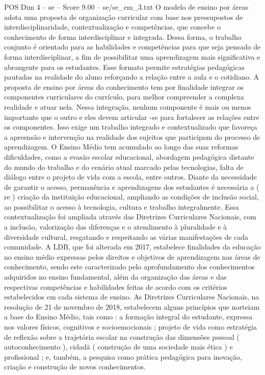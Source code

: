 \begin{textsample}{POS Dim 4 – se – Score 9.00 – se/se\_em\_3.txt}
O modelo de ensino por áreas adota uma proposta de organização curricular com base nos pressupostos de interdisciplinaridade, contextualização e competências, que concebe o conhecimento de forma interdisciplinar e integrada.
Dessa forma, o trabalho conjunto é orientado para as habilidades e competências para que seja pensado de forma interdisciplinar, a fim de possibilitar uma aprendizagem mais significativa e abrangente para os estudantes.
Esse formato permite estratégias pedagógicas pautadas na realidade do aluno reforçando a relação entre a aula e o cotidiano.
A proposta de ensino por áreas do conhecimento tem por finalidade integrar os componentes curriculares do currículo, para melhor compreender a complexa realidade e atuar nela.
Nessa integração, nenhum componente é mais ou menos importante que o outro e eles devem articular -se para fortalecer as relações entre os componentes.
Isso exige um trabalho integrado e contextualizado que favoreça a apreensão e intervenção na realidade dos sujeitos que participam do processo de aprendizagem.
O Ensino Médio tem acumulado ao longo das suas reformas dificuldades, como a evasão escolar educacional, abordagem pedagógica distante do mundo do trabalho e do cenário atual marcado pelas tecnologias, falta de diálogo entre o projeto de vida com a escola, entre outros.
Diante da necessidade de garantir o acesso, permanência e aprendizagens dos estudantes é necessária a ( re ) criação da instituição educacional, ampliando as condições de inclusão social, ao possibilitar o acesso à tecnologia, cultura e trabalho integralmente.
Essa contextualização foi ampliada através das Diretrizes Curriculares Nacionais, com a inclusão, valorização das diferenças e o atendimento à pluralidade e à diversidade cultural, resgatando e respeitando as várias manifestações de cada comunidade.
A LDB, que foi alterada em 2017, estabelece finalidades da educação no ensino médio expressas pelos direitos e objetivos de aprendizagem nas áreas de conhecimento, sendo este caracterizado pelo aprofundamento dos conhecimentos adquiridos no ensino fundamental, além da organização das áreas e das respectivas competências e habilidades feitas de acordo com os critérios estabelecidos em cada sistema de ensino.
As Diretrizes Curriculares Nacionais, na resolução de 21 de novembro de 2018, estabelecem alguns princípios que norteiam a base do Ensino Médio, tais como : a formação integral do estudante, expressa nos valores físicos, cognitivos e socioemocionais ; projeto de vida como estratégia de reflexão sobre a trajetória escolar na construção das dimensões pessoal ( autoconhecimento ), cidadã ( construção de uma sociedade mais ética ) e profissional ; e, também, a pesquisa como prática pedagógica para inovação, criação e construção de novos conhecimentos.

\end{textsample}
